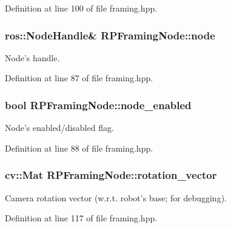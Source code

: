 \-Definition at line 100 of file framing.\-hpp.

\hypertarget{class_r_p_framing_node_ada7424816ecc44a22fc3f96eb32ed51d}{
\subsubsection[{node}]{\setlength{\rightskip}{0pt plus 5cm}ros\-::\-Node\-Handle\& {\bf \-R\-P\-Framing\-Node\-::node}}}\label{class_r_p_framing_node_ada7424816ecc44a22fc3f96eb32ed51d}
\-Node's handle. 

\-Definition at line 87 of file framing.\-hpp.

\hypertarget{class_r_p_framing_node_a59242d677df9d2ef09ac222c98203a2d}{
\subsubsection[{node\-\_\-enabled}]{\setlength{\rightskip}{0pt plus 5cm}bool {\bf \-R\-P\-Framing\-Node\-::node\-\_\-enabled}}}\label{class_r_p_framing_node_a59242d677df9d2ef09ac222c98203a2d}
\-Node's enabled/disabled flag. 

\-Definition at line 88 of file framing.\-hpp.

\hypertarget{class_r_p_framing_node_a118f00fa5a583971493536d0374a1a80}{
\subsubsection[{rotation\-\_\-vector}]{\setlength{\rightskip}{0pt plus 5cm}cv\-::\-Mat {\bf \-R\-P\-Framing\-Node\-::rotation\-\_\-vector}}}\label{class_r_p_framing_node_a118f00fa5a583971493536d0374a1a80}
\-Camera rotation vector (w.\-r.\-t. robot's base; for debugging). 

\-Definition at line 117 of file framing.\-hpp.

